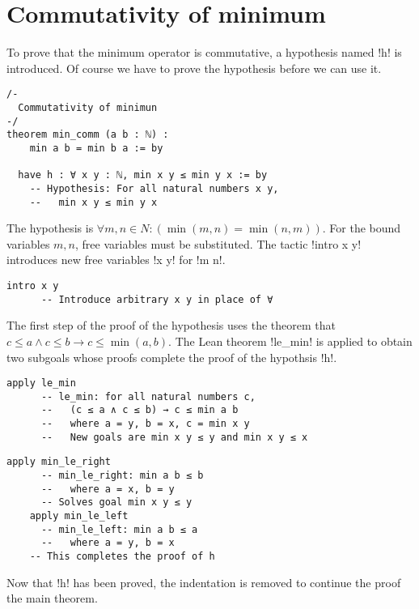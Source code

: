 
\section{Commutativity of minimum}

To prove that the minimum operator is commutative, a hypothesis named !h! is introduced. Of course we have to prove the hypothesis before we can use it.

\begin{Verbatim}
/-
  Commutativity of minimun
-/
theorem min_comm (a b : ℕ) :
    min a b = min b a := by

  have h : ∀ x y : ℕ, min x y ≤ min y x := by
    -- Hypothesis: For all natural numbers x y,
    --   min x y ≤ min y x
\end{Verbatim}


The hypothesis is $\forall m, n \in N : (\min (m,n) = \min (n,m))$. For the bound variables $m, n$, free variables must be substituted. The tactic !intro x y! introduces new free variables !x y! for !m n!.
\begin{Verbatim}[firstnumber=last]
    intro x y
      -- Introduce arbitrary x y in place of ∀
\end{Verbatim}

The first step of the proof of the hypothesis uses the theorem that $c\le a \wedge c \le b \rightarrow c \le \min(a,b)$. The Lean theorem !le_min! is applied to obtain two subgoals whose proofs complete the proof of the hypothsis !h!.

\begin{Verbatim}[firstnumber=last]
    apply le_min
      -- le_min: for all natural numbers c,
      --   (c ≤ a ∧ c ≤ b) → c ≤ min a b
      --   where a = y, b = x, c = min x y
      --   New goals are min x y ≤ y and min x y ≤ x
\end{Verbatim}
\begin{Verbatim}[firstnumber=last]
    apply min_le_right
      -- min_le_right: min a b ≤ b
      --   where a = x, b = y
      -- Solves goal min x y ≤ y
    apply min_le_left
      -- min_le_left: min a b ≤ a
      --   where a = y, b = x
    -- This completes the proof of h
\end{Verbatim}
Now that !h! has been proved, the indentation is removed to continue the proof the main theorem.

